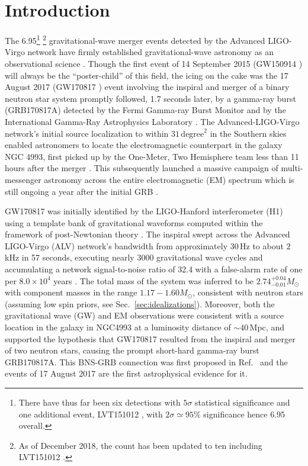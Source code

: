 \documentclass[prd,amsmath,amssymb,aps,floats,amsfonts,notitlepage,superscriptaddress,eqsecnum,nofootinbib,10pt]{revtex4-1}
\begin{document}
\section{Introduction}\label{Sec:Intro}
The 6.95\footnote{There have thus far been six detections with $5\sigma$ statistical significance and one additional event, LVT151012 \cite{TheLIGOScientific:2016pea}, with $2\sigma \simeq 95\%$ significance hence 6.95 overall.}
\footnote{As of December 2018, the count has been updated to ten including LVT151012 \cite{LIGOScientific:2018mvr}.} 
gravitational-wave merger events detected by the Advanced LIGO-Virgo network have firmly established gravitational-wave astronomy
as an observational science \cite{TheLIGOScientific:2016pea, Abbott:2017gyy, Abbott:2017oio, Abbott:2017vtc, GW170817}. 
Though the first event of 14 September 2015 (GW150914 \cite{GW150914}) will always be the ``poster-child'' of this field,
the icing on the cake was the 17 August 2017 (GW170817 \cite{GW170817}) event involving the inspiral and merger of a binary neutron star system 
promptly followed, 1.7 seconds later, by a gamma-ray burst (GRB170817A) detected by the Fermi Gamma-ray Burst Monitor \cite{Fermi} and by the International Gamma-Ray Astrophysics Laboratory \cite{Svinkin, Savchenko:2017ffs}.
The Advanced-LIGO-Virgo network's initial source localization to within $ 31\,\text{degree}^2$ in the Southern skies
enabled astronomers to locate the electromagnetic counterpart in the galaxy NGC 4993, 
first picked up by the One-Meter, Two Hemisphere team less than 11 hours after the merger \cite{Coulter2017, Coulter:2017wya}.
This subsequently launched a massive campaign of multi-messenger astronomy across the entire electromagnetic (EM) spectrum which is still ongoing
a year after the initial GRB \cite{GBM:2017lvd}. 

GW170817 was initially identified by the LIGO-Hanford interferometer (H1) 
using a template bank of gravitational waveforms computed within the framework of post-Newtonian theory \cite{Buonanno:2009zt, Blanchet_LRR}.
The inspiral swept across the Advanced LIGO-Virgo (ALV) network's bandwidth from approximately $ 30\,$Hz to about $ 2\,$kHz in 57 seconds,
executing nearly $ 3000$ gravitational wave cycles and accumulating a network signal-to-noise ratio of 32.4 with a false-alarm rate of one per $8.0\times 10^4$ years \cite{GW170817}. 
The total mass of the system was inferred to be $2.74^{+0.04}_{-0.01} M_\odot$ with component masses in the range $1.17-1.60 M_\odot$, consistent
with neutron stars (assuming low spin priors, see Sec.~\ref{sec:idealizations}).
Moreover, both the gravitational wave (GW) and EM observations were consistent with a source location in the galaxy in NGC4993 
at a luminosity distance of $\sim\! 40\,$Mpc, and supported the hypothesis that GW170817 resulted from the
inspiral and merger of two neutron stars, causing the prompt short-hard gamma-ray burst GRB170817A. %
This BNS-GRB connection was first proposed in Ref.~\cite{Eichler:1989ve} and the events of 17 August 2017 are
the first astrophysical evidence for it.
\end{document}
